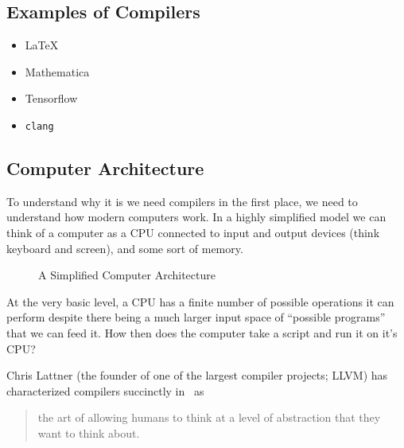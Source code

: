 \subsection{Examples of Compilers}
\begin{itemize}
    \item \LaTeX{}
    \item Mathematica
    \item Tensorflow
    \item \texttt{clang}
\end{itemize}

\subsection{Computer Architecture}
To understand why it is we need compilers in the first place, we need to understand how modern computers work.
In a highly simplified model we can think of a computer as a \ac{CPU} connected to input and output devices (think keyboard and screen), and some sort of memory.
\begin{figure}[h]
    \centering
    \caption{A Simplified Computer Architecture}
    \label{fig:comparch}
\end{figure}

At the very basic level, a \ac{CPU} has a finite number of possible operations it can perform despite there being a much larger input space of ``possible programs'' that we can feed it.
How then does the computer take a script and run it on it's CPU?


Chris Lattner (the founder of one of the largest compiler projects; LLVM) has characterized compilers succinctly in~\cite{lattnerquote} as
\begin{quote}
    the art of allowing humans to think at a level of abstraction that they want to think about.
\end{quote}

